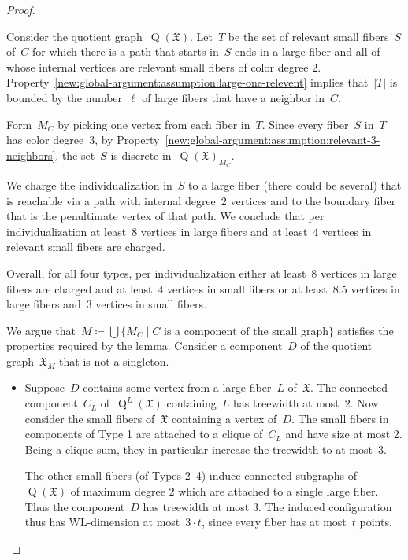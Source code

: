 \documentclass[english,a4paper]{article}
\theoremstyle{plain}
\theoremstyle{definition}
\newcommand{\coherentConfig}{\ensuremath{\mathfrak{X}}}
\DeclareMathOperator*{\Quotient}{Q}
\newcommand{\quotientGraph}[1]{\ensuremath{\Quotient(#1)}}
\newcommand{\quotientGraphLarge}[1]{\ensuremath{\Quotient^L(#1)}}
\begin{document}
\begin{proof}
\begin{itemize}
        Consider the quotient graph~$\quotientGraph{\coherentConfig}$.
        Let~$T$ be the set of relevant small fibers~$S$ of~$C$ for which there is a path that starts in~$S$ ends in a large fiber and all of whose internal vertices are relevant small fibers of color degree 2.  Property~\ref{new:global-argument:assumption:large-one-relevent} implies that~$|T|$ is bounded by the number~$\ell$ of large fibers that have a neighbor in~$C$.

        Form~$M_C$ by picking one vertex from each fiber in~$T$. Since every fiber~$S$ in~$T$ has color degree~$3$, by Property~\ref{new:global-argument:assumption:relevant-3-neighbors}, the set~$S$ is discrete in~$\quotientGraph{\coherentConfig}_{M_C}$.

        We charge the individualization in~$S$ to a large fiber (there could be several) that is reachable via a path with internal degree~$2$ vertices and to the boundary fiber that is the penultimate vertex of that path. We conclude that per individualization at least~$8$ vertices in large fibers and at least~$4$ vertices in relevant small fibers are charged.
    \end{itemize}

    Overall, for all four types, per individualization either at  least~$8$ vertices in large fibers are charged and at least~$4$ vertices in small fibers or at least~$8.5$ vertices in large fibers and~$3$ vertices in small fibers.

    We argue that~$M\coloneqq \bigcup  \{M_C\mid C\text{ is a component of the small graph}\}$ satisfies the properties required by the lemma. Consider a component~$D$ of the quotient graph~$\coherentConfig_M$ that is not a singleton.

    \begin{itemize}
        \item
        Suppose~$D$ contains some vertex from a large fiber~$L$ of~$\coherentConfig$.
        The connected component~$C_L$ of~$\quotientGraphLarge{\coherentConfig}$ containing~$L$ has treewidth at most~$2$.
        Now consider the small fibers of~$\coherentConfig$ containing a vertex of~$D$. The small fibers in components of Type 1 are attached to a clique of~$C_L$ and have size at most 2.
        Being a clique sum, they in particular increase the treewidth to at most~$3$.

        The other small fibers (of Types 2--4) induce connected subgraphs of~$\quotientGraph{\coherentConfig}$ of maximum degree 2 which are attached to a single large fiber. Thus the component~$D$ has treewidth at most 3. The induced configuration thus has WL-dimension at most~$3\cdot t$, since every
        fiber has at most~$t$ points.


\end{itemize}
\end{proof}
\end{document}

